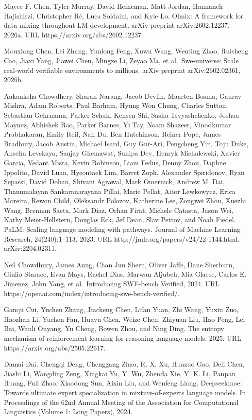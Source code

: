 Mayee F. Chen, Tyler Murray, David Heineman, Matt Jordan, Hannaneh
Hajishirzi, Christopher Ré, Luca Soldaini, and Kyle Lo. Olmix: A
framework for data mixing throughout LM development. arXiv preprint
arXiv:2602.12237, 2026a. URL https://arxiv.org/abs/2602.12237.

Mouxiang Chen, Lei Zhang, Yunlong Feng, Xuwu Wang, Wenting Zhao,
Ruisheng Cao, Jiaxi Yang, Jiawei Chen, Mingze Li, Zeyao Ma, et
al.~Swe-universe: Scale real-world verifiable environments to millions.
arXiv preprint arXiv:2602.02361, 2026b.

Aakanksha Chowdhery, Sharan Narang, Jacob Devlin, Maarten Bosma, Gaurav
Mishra, Adam Roberts, Paul Barham, Hyung Won Chung, Charles Sutton,
Sebastian Gehrmann, Parker Schuh, Kensen Shi, Sasha Tsvyashchenko,
Joshua Maynez, Abhishek Rao, Parker Barnes, Yi Tay, Noam Shazeer,
Vinodkumar Prabhakaran, Emily Reif, Nan Du, Ben Hutchinson, Reiner Pope,
James Bradbury, Jacob Austin, Michael Isard, Guy Gur-Ari, Pengcheng Yin,
Toju Duke, Anselm Levskaya, Sanjay Ghemawat, Sunipa Dev, Henryk
Michalewski, Xavier Garcia, Vedant Misra, Kevin Robinson, Liam Fedus,
Denny Zhou, Daphne Ippolito, David Luan, Hyeontaek Lim, Barret Zoph,
Alexander Spiridonov, Ryan Sepassi, David Dohan, Shivani Agrawal, Mark
Omernick, Andrew M. Dai, Thanumalayan Sankaranarayana Pillai, Marie
Pellat, Aitor Lewkowycz, Erica Moreira, Rewon Child, Oleksandr Polozov,
Katherine Lee, Zongwei Zhou, Xuezhi Wang, Brennan Saeta, Mark Diaz,
Orhan Firat, Michele Catasta, Jason Wei, Kathy Meier-Hellstern, Douglas
Eck, Jef Dean, Slav Petrov, and Noah Fiedel. PaLM: Scaling language
modeling with pathways. Journal of Machine Learning Research,
24(240):1--113, 2023. URL http://jmlr.org/papers/v24/22-1144.html.
arXiv:2204.02311.

Neil Chowdhury, James Aung, Chan Jun Shern, Oliver Jaffe, Dane Sherburn,
Giulio Starace, Evan Mays, Rachel Dias, Marwan Aljubeh, Mia Glaese,
Carlos E. Jimenez, John Yang, et al.~Introducing SWE-bench Verified,
2024. URL https://openai.com/index/introducing-swe-bench-verified/.

Ganqu Cui, Yuchen Zhang, Jiacheng Chen, Lifan Yuan, Zhi Wang, Yuxin Zuo,
Haozhan Li, Yuchen Fan, Huayu Chen, Weize Chen, Zhiyuan Liu, Hao Peng,
Lei Bai, Wanli Ouyang, Yu Cheng, Bowen Zhou, and Ning Ding. The entropy
mechanism of reinforcement learning for reasoning language models, 2025.
URL https://arxiv.org/abs/2505.22617.

Damai Dai, Chengqi Deng, Chenggang Zhao, R. X. Xu, Huazuo Gao, Deli
Chen, Jiashi Li, Wangding Zeng, Xingkai Yu, Y. Wu, Zhenda Xie, Y. K. Li,
Panpan Huang, Fuli Zhao, Xiaodong Sun, Aixin Liu, and Wenfeng Liang.
Deepseekmoe: Towards ultimate expert specialization in
mixture-of-experts language models. In Proceedings of the 62nd Annual
Meeting of the Association for Computational Linguistics (Volume 1: Long
Papers), 2024.

